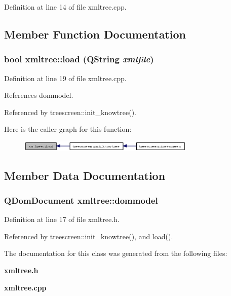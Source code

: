 Definition at line 14 of file xmltree.cpp.

\subsection{Member Function Documentation}
\subsubsection{\setlength{\rightskip}{0pt plus 5cm}bool xmltree::load (QString {\em xmlfile})}\label{classxmltree_40ceaaf2da01e919f0735ad703356e49}




Definition at line 19 of file xmltree.cpp.

References dommodel.

Referenced by treescreen::init\_\-knowtree().

Here is the caller graph for this function:\begin{figure}[H]
\begin{center}
\leavevmode
\includegraphics[width=239pt]{classxmltree_40ceaaf2da01e919f0735ad703356e49_icgraph}
\end{center}
\end{figure}


\subsection{Member Data Documentation}
\subsubsection{\setlength{\rightskip}{0pt plus 5cm}QDom\-Document {\bf xmltree::dommodel}}\label{classxmltree_6b469b6c9de2ec31c4ba1c8444ba5994}




Definition at line 17 of file xmltree.h.

Referenced by treescreen::init\_\-knowtree(), and load().

The documentation for this class was generated from the following files:\begin{CompactItemize}
\item 
{\bf xmltree.h}\item 
{\bf xmltree.cpp}\end{CompactItemize}
